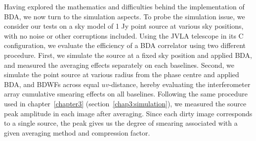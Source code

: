 \documentclass[useAMS,usenatbib]{mn2e}
\begin{document}
Having explored the mathematics and difficulties behind  the implementation  of BDA,
we now turn to the simulation aspects. To probe the simulation issue, we consider our tests
on a sky model of 1 Jy point source at various sky positions,  with no noise or other corruptions included.
Using the JVLA telescope in its C configuration, we evaluate the efficiency of a BDA correlator using 
two different procedure. First, we simulate the source at a fixed sky position and applied BDA, and measured 
the averaging effects separately on each baselines. Second, we simulate the point source  at various radius from the phase 
centre and applied BDA, and BDWFs across equal $uv$-distance, hereby  evaluating the interferometer array 
cumulative smearing effects on all baselines. 
Following the same procedure used in chapter~\ref{chapter3} (section~\ref{chap3:simulation}), we measured the source 
peak amplitude in each image after averaging. Since each dirty image corresponds to a single source, the peak gives
us the degree of smearing associated with a given averaging method and compression factor.
\end{document}
